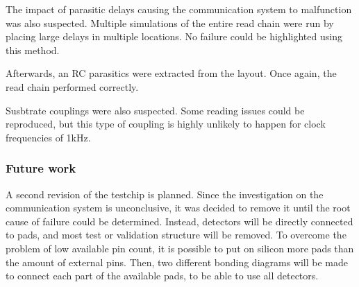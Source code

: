The impact of parasitic delays causing the communication system to malfunction was also suspected.
Multiple simulations of the entire read chain were run by placing large delays in multiple locations.
No failure could be highlighted using this method.

Afterwards, an RC parasitics were extracted from the layout.
Once again, the read chain performed correctly.

Susbtrate couplings were also suspected.
Some reading issues could be reproduced, but this type of coupling is highly unlikely to happen for clock frequencies of 1kHz.


\subsubsection{Future work}

A second revision of the testchip is planned.
Since the investigation on the communication system is unconclusive, it was decided to remove it until the root cause of failure could be determined.
Instead, detectors will be directly connected to pads, and most test or validation structure will be removed.
To overcome the problem of low available pin count, it is possible to put on silicon more pads than the amount of external pins.
Then, two different bonding diagrams will be made to connect each part of the available pads, to be able to use all detectors.
